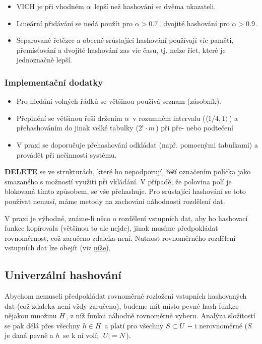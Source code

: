 \begin{itemize}
\tightlist
\item
  VICH je při vhodném \(\alpha\,\!\) lepší než hashování se dvěma
  ukazateli.
\item
  Lineární přidávání se nedá použít pro \(\alpha > 0.7\,\!\), dvojité
  hashování pro \(\alpha > 0.9\,\!\).
\item
  Separované řetězce a obecné srůstající hashování používají víc paměti,
  přemísťování a dvojité hashování zas víc času, tj. nelze říct, které
  je jednoznačně lepší.
\end{itemize}

\subsubsection{Implementační
dodatky}\label{implementaux10dnuxed-dodatky}

\begin{itemize}
\tightlist
\item
  Pro hledání volných řádků se většinou používá seznam (zásobník).
\item
  Přeplnění se většinou řeší držením \(\alpha\,\!\) v rozumném intervalu
  (\(\langle 1/4, 1\rangle\,\!\)) a přehashováním do jinak velké tabulky
  (\(2^i\cdot m\,\!\)) při pře- nebo podtečení
\item
  V praxi se doporučuje přehashování odkládat (např. pomocnými
  tabulkami) a provádět při nečinnosti systému.
\end{itemize}

\textbf{DELETE} se ve strukturách, které ho nepodporují, řeší označením
políčka jako smazaného s možností využití při vkládání. V případě, že
polovina polí je blokovaná tímto způsobem, se vše přehashuje. Pro
srůstající hashování se toto používat nemusí, máme metody na zachování
náhodnosti rozdělení dat.

V praxi je výhodné, známe-li něco o rozdělení vstupních dat, aby ho
hashovací funkce kopírovala (většinou to ale nejde), jinak musíme
předpokládat rovnoměrnost, což zaručeno zdaleka není. Nutnost
rovnoměrného rozdělení vstupních dat lze obejít (viz
\protect\hyperlink{Univerzuxe1lnuxed_hashovuxe1nuxed}{níže}).

\subsection{Univerzální
hashování}\label{univerzuxe1lnuxed-hashovuxe1nuxed}

Abychom nemuseli předpokládat rovnoměrné rozložení vstupních hashovaných
dat (což zdaleka není vždy zaručeno), budeme mít místo pevné hash-funkce
nějakou množinu \(H\,\!\), z níž funkci náhodně rovnoměrně vyberu.
Analýza složitostí se pak dělá přes všechny \(h\in H\,\!\) a platí pro
všechny \(S\subset U\,\!\) -\/- i nerovnoměrné (\(S\,\!\) je daná pevně
a \(h\,\!\) se k ní volí; \(|U|=N\,\!\)).

